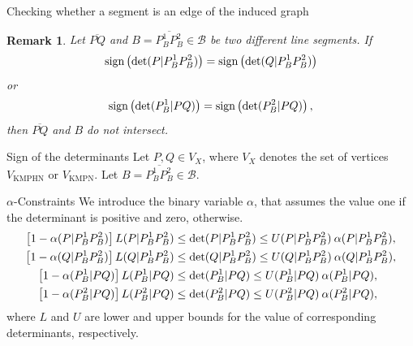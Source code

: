 \documentclass[slidestop,usepdftitle=false,10pt]{beamer}
\newcommand{\VKMPHN}{{V_{\text{KMPHN}}}}
\newcommand{\VKMPN}{{V_{\text{KMPN}}}}
\newtheorem{remark}{Remark}
\newcommand{\determinant}[3]{\det({#1|#2#3})}
\begin{document}
	\begin{frame}{\large{Checking whether a segment is an edge of the induced graph}}
		\begin{remark}\label{rem:determinants}
			Let $\overline{PQ}$ and $B=\overline{P_B^1P_B^2}\in\mathcal B$ be two different line segments. 
			If
			$$
			\normalfont{\text{sign}}\left(\determinant{P}{P_B^1}{P_B^2}\right) = \normalfont{\text{sign}}\left(\determinant{Q}{P_B^1}{P_B^2}\right)
			$$
			or
			$$
			\normalfont{\text{sign}}\left(\determinant{P_B^1}{P}{Q}\right) = \normalfont{\text{sign}}\left(\determinant{P_B^2}{P}{Q}\right),
			$$
			then $\overline{PQ}$ and $B$ do not intersect.
		\end{remark}
	\end{frame}

	\begin{frame}{Sign of the determinants}
		\footnotesize
		 Let $P,Q\in V_X$, where $V_X$ denotes the set of vertices $\VKMPHN$ or $\VKMPN$. Let $B=\overline{P_B^1P_B^2}\in\mathcal B$.
		\begin{block}{$\alpha$-Constraints}
		We introduce the binary variable $\alpha$, that assumes the value one if the determinant is positive and zero, otherwise.
		\begin{align*}\label{eq:alphaC}
			\left[1-\alphamas{P}{P_B^1}{P_B^2}\right]\LS{P}{P_B^1}{P_B^2}&\leq\determinant{P}{P_B^1}{P_B^2}\leq \US{P}{P_B^1}{P_B^2}\:\alphamas{P}{P_B^1}{P_B^2},\\
			\left[1-\alphamas{Q}{P_B^1}{P_B^2}\right]\LS{Q}{P_B^1}{P_B^2}&\leq\determinant{Q}{P_B^1}{P_B^2}\leq \US{Q}{P_B^1}{P_B^2}\:\alphamas{Q}{P_B^1}{P_B^2},\\
			\left[1-\alphamas{P_B^1}{P}{Q}\right]\LS{P_B^1}{P}{Q}&\leq\determinant{P_B^1}{P}{Q}\leq \US{P_B^1}{P}{Q}\:\alphamas{P_B^1}{P}{Q},\\		\left[1-\alphamas{P_B^2}{P}{Q}\right]\LS{P_B^2}{P}{Q}&\leq\determinant{P_B^2}{P}{Q}\leq \US{P_B^2}{P}{Q}\:\alphamas{P_B^2}{P}{Q},
		\end{align*}
		 where $L$ and $U$ are lower and upper bounds for the value of corresponding determinants, respectively.
		 \end{block}
		
	\end{frame}
	\newcommand{\betamas}[4]{\beta(#1#2|#3#4)}
	\newcommand{\gammaprod}[4]{\gamma(#1#2|#3#4)}
	
\end{document}

